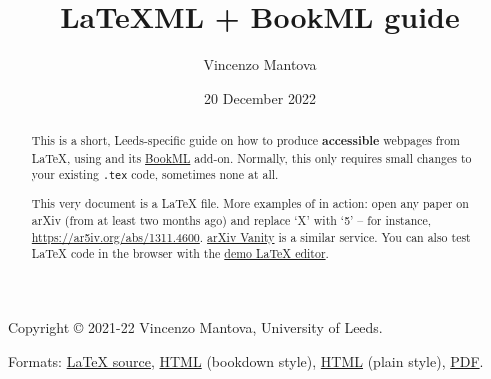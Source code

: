 \documentclass[a4paper]{article}
\title{LaTeXML + BookML guide}
\author{Vincenzo Mantova}
\date{20 December 2022}
\theoremstyle{definition}
\begin{document}
\begin{lxFooter}
  Copyright \copyright{} 2021-22 Vincenzo Mantova, University of Leeds.
\end{lxFooter}
\fancyfoot[C]{}
\fancyfoot[R]{\thepage}
\pagestyle{fancy}


\maketitle

\begin{abstract}
  This is a short, Leeds-specific guide on how to produce \textbf{accessible} webpages from \LaTeX{}, using \LaTeXML{} and its \href{https://vlmantova.github.io/bookml/}{BookML} add-on. Normally, this only requires small changes to your existing \verb|.tex| code, sometimes none at all.

  This very document is a \LaTeX{} file. More examples of \LaTeXML{} in action: open any paper on arXiv (from at least two months ago) and replace `X' with `5' -- for instance, \url{https://ar5iv.org/abs/1311.4600}. \href{https://www.arxiv-vanity.com/}{arXiv Vanity} is a similar service. You can also test \LaTeX{} code in the browser with the \href{https://latexml.mathweb.org/editor}{demo \LaTeX{} editor}.
\end{abstract}

\begin{center}
  Formats: \href{https://dev.azure.com/pmtvlm-leeds-ac-uk/public/_git/latexmlleeds}{\LaTeX{} source}, \href{https://minerva.leeds.ac.uk/bbcswebdav/courses/201920_MAPS_MM8863/latexmlleeds/index.html}{HTML} (bookdown style), \href{https://minerva.leeds.ac.uk/bbcswebdav/courses/201920_MAPS_MM8863/latexmlleeds/index.plain.html}{HTML} (plain style), \href{https://minerva.leeds.ac.uk/bbcswebdav/courses/201920_MAPS_MM8863/latexmlleeds/LaTeXML-Leeds.pdf}{PDF}.
\end{center}
\end{document}
